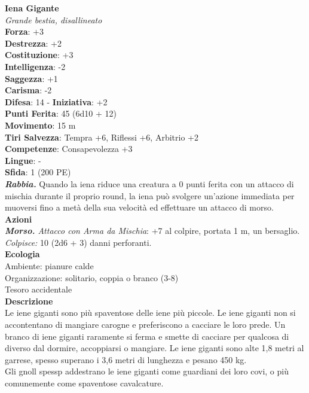 \begin{multicols}{2}
\medskip\textbf{Iena Gigante}\\
\emph{Grande bestia, disallineato}\\
\textbf{Forza}: +3\\
\textbf{Destrezza}: +2\\
\textbf{Costituzione}: +3\\
\textbf{Intelligenza}: -2\\
\textbf{Saggezza}: +1\\
\textbf{Carisma}: -2\\
\textbf{Difesa}: 14 - \textbf{Iniziativa}: +2\\
\textbf{Punti Ferita}: 45 (6d10 + 12)\\
\textbf{Movimento}: 15 m\\
\textbf{Tiri Salvezza}: Tempra +6, Riflessi +6, Arbitrio +2 \\
\textbf{Competenze}: Consapevolezza +3\\
\textbf{Lingue}: -\\
\textbf{Sfida}: 1 (200 PE)\smallskip\\
\emph{\textbf{Rabbia.}} Quando la iena riduce una creatura a 0 punti ferita con un attacco di mischia durante il proprio round, la iena può svolgere un'azione immediata per muoversi fino a metà della sua velocità ed effettuare un attacco di morso.\\
\smallskip\textbf{Azioni}\\
\emph{\textbf{Morso.} Attacco con Arma da Mischia}: +7 al colpire, portata 1 m, un bersaglio.\\
\emph{Colpisce:} 10 (2d6 + 3) danni perforanti.\\
\textbf{Ecologia}\\
Ambiente: pianure calde\\
Organizzazione: solitario, coppia o branco (3-8)\\
Tesoro accidentale\\
\textbf{Descrizione}\\
Le iene giganti sono più spaventose delle iene più piccole. Le iene giganti non si accontentano di mangiare carogne e preferiscono a cacciare le loro prede. Un branco di  iene giganti raramente si ferma e smette di cacciare per qualcosa di diverso dal dormire, accoppiarsi o mangiare. Le iene giganti sono alte 1,8 metri al garrese, spesso superano i 3,6 metri di lunghezza e pesano 450 kg.\\

Gli gnoll spessp addestrano le iene giganti come guardiani dei loro covi, o più comunemente come spaventose cavalcature.\\



\end{multicols}
